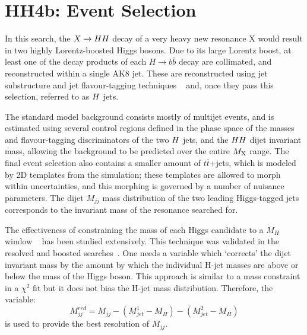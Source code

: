 \chapter{HH4b: Event Selection}
\label{chap:five}

In this search, the $X \to HH$ decay of a very heavy new resonance X would result in two highly Lorentz-boosted Higgs bosons.  Due to its large Lorentz boost, at least one of the decay products of each $H \to b\bar b$ decay are collimated, and reconstructed within a single AK8 jet. 
These are reconstructed using jet substructure and jet flavour-tagging techniques ~\cite{Butterworth:2008iy,Cooper:2013kia,Gouzevitch:2013qca} and, once they pass this selection, referred to as $H$ jets.

The standard model background consists mostly of multijet events, and is estimated using several control regions defined in the phase space of the masses and flavour-tagging discriminators of the two $H$ jets, and the $HH$ dijet invariant mass, allowing the background to be predicted over the entire $M_{\textrm X}$ range. 
The final event selection also contains a smaller amount of $t\bar{t}$+jets, which is modeled by 2D templates from the simulation; these templates are allowed to morph within uncertainties, and this morphing is governed by a number of nuisance parameters.
The dijet $M_{jj}$ mass distribution of the two leading Higgs-tagged jets corresponds to the invariant mass of the resonance searched for. 

The effectiveness of constraining the mass of each Higgs candidate to a $M_H$ window ~\cite{CMS-PAS-B2G-16-026} has been studied extensively. This technique was validated in the resolved and boosted searches~\cite{CMS-PAS-B2G-16-026}. One needs a variable which `corrects' the dijet invariant mass by the amount by which the individual H-jet masses are above or below the mass of the Higgs boson.  This approach is similar to a mass constraint in a $\chi^2$ fit but it does not bias the H-jet mass distribution. Therefore, the variable:
\begin{equation}
M^{red}_{jj} = M_{jj} - (M^1_{jet} - M_H) - (M^2_{jet} - M_H) \label{eq:mred}
\end{equation} 
is used to provide the best resolution of $M_{jj}$. 

